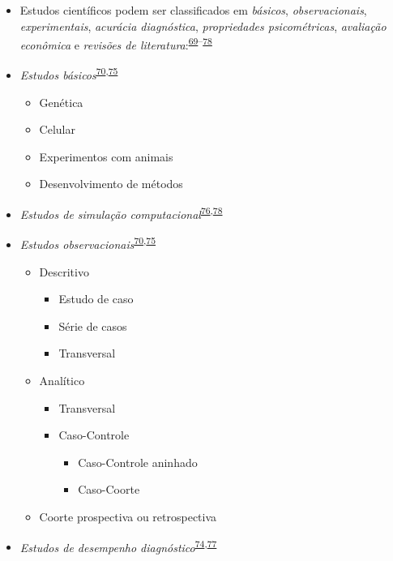 \documentclass[
]{book}
\begin{document}
\begin{itemize}
\item
  Estudos científicos podem ser classificados em \emph{básicos}, \emph{observacionais}, \emph{experimentais}, \emph{acurácia diagnóstica}, \emph{propriedades psicométricas}, \emph{avaliação econômica} e \emph{revisões de literatura}:\textsuperscript{\protect\hyperlink{ref-Grant2009}{69}--\protect\hyperlink{ref-chipman2022}{78}}
\item
  \emph{Estudos básicos}\textsuperscript{\protect\hyperlink{ref-Suxfct2014}{70},\protect\hyperlink{ref-Chidambaram2019}{75}}

  \begin{itemize}
  \item
    Genética
  \item
    Celular
  \item
    Experimentos com animais
  \item
    Desenvolvimento de métodos
  \end{itemize}
\item
  \emph{Estudos de simulação computacional}\textsuperscript{\protect\hyperlink{ref-Erdemir2020}{76},\protect\hyperlink{ref-chipman2022}{78}}
\item
  \emph{Estudos observacionais}\textsuperscript{\protect\hyperlink{ref-Suxfct2014}{70},\protect\hyperlink{ref-Chidambaram2019}{75}}

  \begin{itemize}
  \item
    Descritivo

    \begin{itemize}
    \item
      Estudo de caso
    \item
      Série de casos
    \item
      Transversal
    \end{itemize}
  \item
    Analítico

    \begin{itemize}
    \item
      Transversal
    \item
      Caso-Controle

      \begin{itemize}
      \item
        Caso-Controle aninhado
      \item
        Caso-Coorte
      \end{itemize}
    \end{itemize}
  \item
    Coorte prospectiva ou retrospectiva
  \end{itemize}
\item
  \emph{Estudos de desempenho diagnóstico}\textsuperscript{\protect\hyperlink{ref-Chassuxe92019}{74},\protect\hyperlink{ref-Yang2021}{77}}


\end{itemize}
\end{document}

